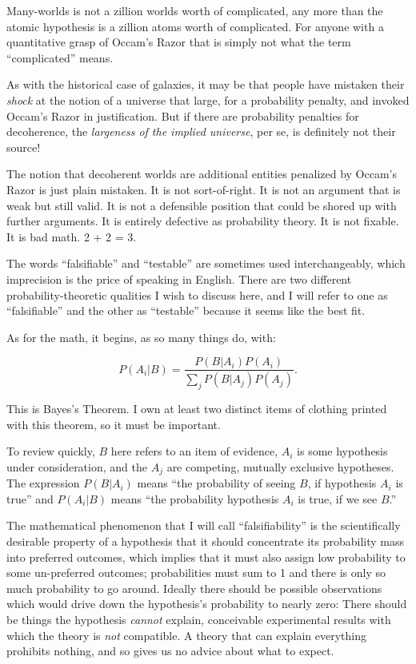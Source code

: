 {
 Many-worlds is not a zillion worlds worth of complicated, any more
than the atomic hypothesis is a zillion atoms worth of complicated. For
anyone with a quantitative grasp of Occam's Razor that
is simply not what the term
``complicated'' means.}

{
 As with the historical case of galaxies, it may be that people
have mistaken their \textit{shock} at the notion of a universe that
large, for a probability penalty, and invoked Occam's
Razor in justification. But if there are probability penalties for
decoherence, the \textit{largeness of the implied universe}, per se, is
definitely not their source!}

{
 The notion that decoherent worlds are additional entities
penalized by Occam's Razor is just plain mistaken. It
is not sort-of-right. It is not an argument that is weak but still
valid. It is not a defensible position that could be shored up with
further arguments. It is entirely defective as probability theory. It
is not fixable. It is bad math. 2 + 2 = 3.}

\myendsectiontext


{
 The words ``falsifiable'' and
``testable'' are sometimes used
interchangeably, which imprecision is the price of speaking in English.
There are two different probability-theoretic qualities I wish to
discuss here, and I will refer to one as
``falsifiable'' and the other as
``testable'' because it seems like
the best fit.}

{
 As for the math, it begins, as so many things do, with:}

\begin{equation*}
  P(A_i|B) = \frac{P(B|A_i)P(A_i)}
  {\sum_j P(B|A_j)P(A_j)}.
\end{equation*}


\bigskip

{
 This is Bayes's Theorem. I own at least two
distinct items of clothing printed with this theorem, so it must be
important. }

{
 To review quickly, $B$ here refers to an item of evidence,
$A_{i}$ is some hypothesis under consideration, and the
$A_{j}$ are competing, mutually exclusive hypotheses. The
expression $P(B|A_{i})$ means
``the probability of seeing $B$, if hypothesis
$A_{i}$ is true'' and
$P(A_{i}|B)$ means ``the
probability hypothesis $A_{i}$ is true, if we see
$B$.''}

{
 The mathematical phenomenon that I will call
``falsifiability'' is the
scientifically desirable property of a hypothesis that it should
concentrate its probability mass into preferred outcomes, which implies
that it must also assign low probability to some un-preferred outcomes;
probabilities must sum to 1 and there is only so much probability to go
around. Ideally there should be possible observations which would drive
down the hypothesis's probability to nearly zero: There
should be things the hypothesis \textit{cannot} explain, conceivable
experimental results with which the theory is \textit{not} compatible.
A theory that can explain everything prohibits nothing, and so gives us
no advice about what to expect.}

